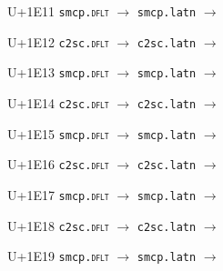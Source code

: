 \documentclass{article}
\begin{document}
\begin{substitutions}
\goodbreak

U+1E11  \linebreak
    \texttt{smcp.\textsc{dflt}} $\to$  \linebreak
    \texttt{smcp.latn} $\to$  

\goodbreak

U+1E12  \linebreak
    \texttt{c2sc.\textsc{dflt}} $\to$  \linebreak
    \texttt{c2sc.latn} $\to$  

\goodbreak

U+1E13  \linebreak
    \texttt{smcp.\textsc{dflt}} $\to$  \linebreak
    \texttt{smcp.latn} $\to$  

\goodbreak

U+1E14  \linebreak
    \texttt{c2sc.\textsc{dflt}} $\to$  \linebreak
    \texttt{c2sc.latn} $\to$  

\goodbreak

U+1E15  \linebreak
    \texttt{smcp.\textsc{dflt}} $\to$  \linebreak
    \texttt{smcp.latn} $\to$  

\goodbreak

U+1E16  \linebreak
    \texttt{c2sc.\textsc{dflt}} $\to$  \linebreak
    \texttt{c2sc.latn} $\to$  

\goodbreak

U+1E17  \linebreak
    \texttt{smcp.\textsc{dflt}} $\to$  \linebreak
    \texttt{smcp.latn} $\to$  

\goodbreak

U+1E18  \linebreak
    \texttt{c2sc.\textsc{dflt}} $\to$  \linebreak
    \texttt{c2sc.latn} $\to$  

\goodbreak

U+1E19  \linebreak
    \texttt{smcp.\textsc{dflt}} $\to$  \linebreak
    \texttt{smcp.latn} $\to$  


\end{substitutions}
\end{document}
